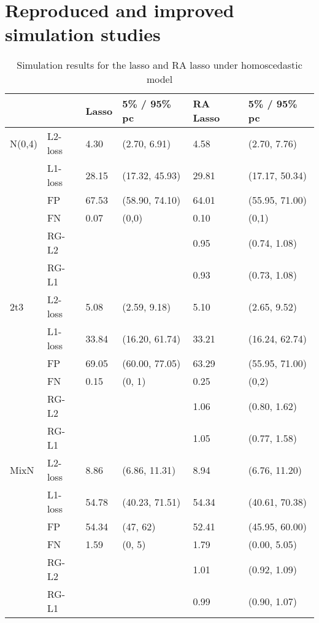 

\section{Reproduced and improved simulation studies}\label{sec:newsimulation}


\begin{table}[]
\centering
\begin{tabular}{llllll}
       &         & Lasso    & 5\% / 95\% pc & RA Lasso  & 5\% / 95\% pc \\ \hline
N(0,4) & L2-loss & 4.30 & (2.70, 6.91)     & 4.58  & (2.70, 7.76)     \\
       & L1-loss & 28.15 & (17.32, 45.93)     & 29.81  & (17.17, 50.34)     \\
       & FP      & 67.53    & (58.90, 74.10)             & 64.01     & (55.95, 71.00)           \\
       & FN      & 0.07     & (0,0)                    & 0.10       & (0,1)                    \\
       & RG-L2   &          &                          & 0.95  & (0.74, 1.08)   \\
       & RG-L1   &          &                          & 0.93  & (0.73, 1.08)   \\ \hline
2t3    & L2-loss & 5.08 & (2.59, 9.18)     & 5.10  & (2.65, 9.52)     \\
       & L1-loss & 33.84 & (16.20, 61.74)     & 33.21  & (16.24, 62.74)     \\
       & FP      & 69.05    & (60.00, 77.05)              & 63.29     & (55.95, 71.00)           \\
       & FN      & 0.15     & (0, 1)                   & 0.25      & (0,2)                    \\
       & RG-L2   &          &                          & 1.06 & (0.80, 1.62)   \\
       & RG-L1   &          &                          & 1.05  & (0.77, 1.58)     \\ \hline
MixN   & L2-loss & 8.86 & (6.86, 11.31)    & 8.94  & (6.76, 11.20)    \\
       & L1-loss & 54.78 & (40.23, 71.51)     & 54.34  & (40.61, 70.38)     \\
       & FP      & 54.34    & (47, 62)                 & 52.41     & (45.95, 60.00)           \\
       & FN      & 1.59     & (0, 5)                   & 1.79      & (0.00, 5.05)             \\
       & RG-L2   &          &                          & 1.01 & (0.92, 1.09)   \\
       & RG-L1   &          &                          & 0.99  & (0.90, 1.07)  
\end{tabular}
\caption{Simulation results for the lasso and RA lasso under homoscedastic model}
\end{table}